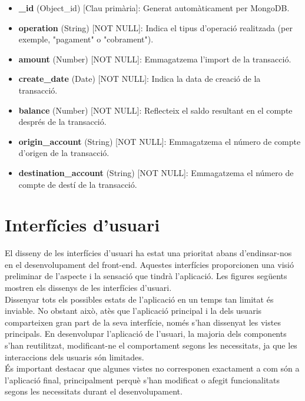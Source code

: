 \documentclass[a4paper,12pt,twoside]{ThesisStyle}
\begin{document}
\begin{itemize}
    \item \textbf{\_id} (Object\_id) [Clau primària]: Generat automàticament per MongoDB.
    \item \textbf{operation} (String) [NOT NULL]: Indica el tipus d'operació realitzada (per exemple, "pagament" o "cobrament").
    \item \textbf{amount} (Number) [NOT NULL]: Emmagatzema l'import de la transacció.
    \item \textbf{create\_date} (Date) [NOT NULL]: Indica la data de creació de la transacció.
    \item \textbf{balance} (Number) [NOT NULL]: Reflecteix el saldo resultant en el compte després de la transacció.
    \item \textbf{origin\_account} (String) [NOT NULL]: Emmagatzema el número de compte d'origen de la transacció.
    \item \textbf{destination\_account} (String) [NOT NULL]: Emmagatzema el número de compte de destí de la transacció.
\end{itemize}






\section{ Interfícies d'usuari }
\label{ sec: Interfícies d'usuari }


El disseny de les interfícies d'usuari ha estat una prioritat abans d'endinsar-nos en el desenvolupament del front-end. Aquestes interfícies proporcionen una visió preliminar de l'aspecte i la sensació que tindrà l'aplicació. Les figures següents mostren els dissenys de les interfícies d'usuari. \\

Dissenyar tots els possibles estats de l'aplicació en un temps tan limitat és inviable. No obstant això, atès que l'aplicació principal i la dels usuaris comparteixen gran part de la seva interfície, només s'han dissenyat les vistes principals. En desenvolupar l'aplicació de l'usuari, la majoria dels components s'han reutilitzat, modificant-ne el comportament segons les necessitats, ja que les interaccions dels usuaris són limitades.\\

És important destacar que algunes vistes no corresponen exactament a com són a l'aplicació final, principalment perquè s'han modificat o afegit funcionalitats segons les necessitats durant el desenvolupament.\\
\end{document}
